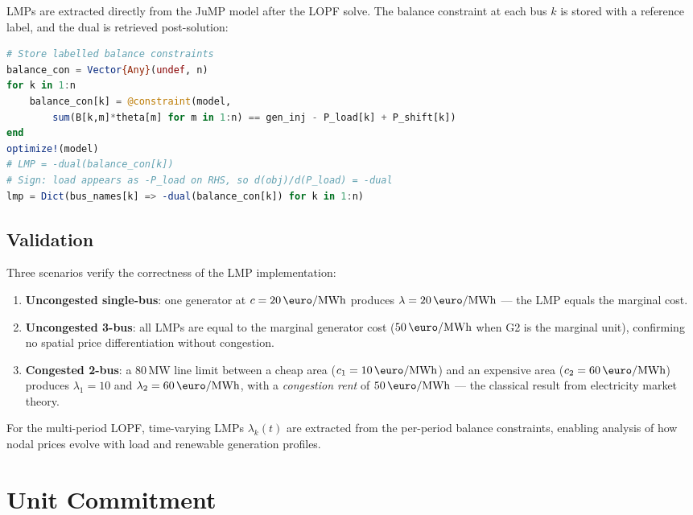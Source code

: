LMPs are extracted directly from the JuMP model after the LOPF solve. The balance constraint at each bus $k$ is stored with a reference label, and the dual is retrieved post-solution:

\begin{lstlisting}[language=Julia, caption={LMP extraction from JuMP dual variables}, label={lst:lmp}]
# Store labelled balance constraints
balance_con = Vector{Any}(undef, n)
for k in 1:n
    balance_con[k] = @constraint(model,
        sum(B[k,m]*theta[m] for m in 1:n) == gen_inj - P_load[k] + P_shift[k])
end
optimize!(model)
# LMP = -dual(balance_con[k])
# Sign: load appears as -P_load on RHS, so d(obj)/d(P_load) = -dual
lmp = Dict(bus_names[k] => -dual(balance_con[k]) for k in 1:n)
\end{lstlisting}

\subsection{Validation}

Three scenarios verify the correctness of the LMP implementation:

\begin{enumerate}
    \item \textbf{Uncongested single-bus}: one generator at $c = 20\,\text{\euro/MWh}$ produces $\lambda = 20\,\text{\euro/MWh}$ --- the LMP equals the marginal cost.
    \item \textbf{Uncongested 3-bus}: all LMPs are equal to the marginal generator cost ($50\,\text{\euro/MWh}$ when G2 is the marginal unit), confirming no spatial price differentiation without congestion.
    \item \textbf{Congested 2-bus}: a 80\,MW line limit between a cheap area ($c_1 = 10\,\text{\euro/MWh}$) and an expensive area ($c_2 = 60\,\text{\euro/MWh}$) produces $\lambda_1 = 10$ and $\lambda_2 = 60\,\text{\euro/MWh}$, with a \emph{congestion rent} of $50\,\text{\euro/MWh}$ --- the classical result from electricity market theory.
\end{enumerate}

For the multi-period LOPF, time-varying LMPs $\lambda_k(t)$ are extracted from the per-period balance constraints, enabling analysis of how nodal prices evolve with load and renewable generation profiles.

\section{Unit Commitment}
\label{sec:uc}

